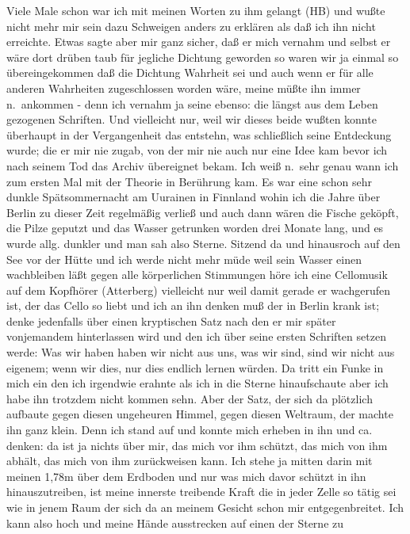 \documentclass[
]{article}
\begin{document}
\begin{itemize}
  Viele Male schon war ich mit meinen Worten zu ihm gelangt (HB) und
  wußte nicht mehr mir sein dazu Schweigen anders zu erklären als daß
  ich ihn nicht erreichte. Etwas sagte aber mir ganz sicher, daß er mich
  vernahm und selbst er wäre dort drüben taub für jegliche Dichtung
  geworden so waren wir ja einmal so übereingekommen daß die Dichtung
  Wahrheit sei und auch wenn er für alle anderen Wahrheiten
  zugeschlossen worden wäre, meine müßte ihn immer n.~ankommen - denn
  ich vernahm ja seine ebenso: die längst aus dem Leben gezogenen
  Schriften. Und vielleicht nur, weil wir dieses beide wußten konnte
  überhaupt in der Vergangenheit das entstehn, was schließlich seine
  Entdeckung wurde; die er mir nie zugab, von der mir nie auch nur eine
  Idee kam bevor ich nach seinem Tod das Archiv übereignet bekam. Ich
  weiß n.~sehr genau wann ich zum ersten Mal mit der Theorie in
  Berührung kam. Es war eine schon sehr dunkle Spätsommernacht am
  Uurainen in Finnland wohin ich die Jahre über Berlin zu dieser Zeit
  regelmäßig verließ und auch dann wären die Fische geköpft, die Pilze
  geputzt und das Wasser getrunken worden drei Monate lang, und es wurde
  allg. dunkler und man sah also Sterne. Sitzend da und hinausroch auf
  den See vor der Hütte und ich werde nicht mehr müde weil sein Wasser
  einen wachbleiben läßt gegen alle körperlichen Stimmungen höre ich
  eine Cellomusik auf dem Kopfhörer (Atterberg) vielleicht nur weil
  damit gerade er wachgerufen ist, der das Cello so liebt und ich an ihn
  denken muß der in Berlin krank ist; denke jedenfalls über einen
  kryptischen Satz nach den er mir später vonjemandem hinterlassen wird
  und den ich über seine ersten Schriften setzen werde: Was wir haben
  haben wir nicht aus uns, was wir sind, sind wir nicht aus eigenem;
  wenn wir dies, nur dies endlich lernen würden. Da tritt ein Funke in
  mich ein den ich irgendwie erahnte als ich in die Sterne hinaufschaute
  aber ich habe ihn trotzdem nicht kommen sehn. Aber der Satz, der sich
  da plötzlich aufbaute gegen diesen ungeheuren Himmel, gegen diesen
  Weltraum, der machte ihn ganz klein. Denn ich stand auf und konnte
  mich erheben in ihn und ca. denken: da ist ja nichts über mir, das
  mich vor ihm schützt, das mich von ihm abhält, das mich von ihm
  zurückweisen kann. Ich stehe ja mitten darin mit meinen 1,78m über dem
  Erdboden und nur was mich davor schützt in ihn hinauszutreiben, ist
  meine innerste treibende Kraft die in jeder Zelle so tätig sei wie in
  jenem Raum der sich da an meinem Gesicht schon mir entgegenbreitet.
  Ich kann also hoch und meine Hände ausstrecken auf einen der Sterne zu

\end{itemize}
\end{document}
